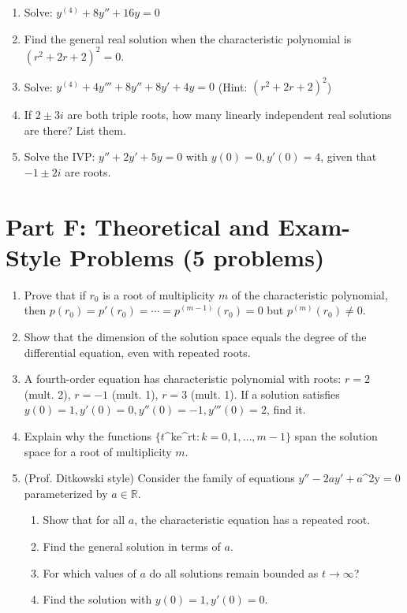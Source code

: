 \documentclass[12pt]{article}
\begin{document}
\begin{enumerate}[resume]
\item Solve: $y^{(4)} + 8y'' + 16y = 0$

\item Find the general real solution when the characteristic polynomial is $(r^{2} + 2r + 2)^{2} = 0$.

\item Solve: $y^{(4)} + 4y''' + 8y'' + 8y' + 4y = 0$ (Hint: $(r^{2} + 2r + 2)^{2}$)

\item If $2 \pm 3i$ are both triple roots, how many linearly independent real solutions are there? List them.

\item Solve the IVP: $y'' + 2y' + 5y = 0$ with $y(0) = 0, y'(0) = 4$, given that $-1 \pm 2i$ are roots.
\end{enumerate}

\section*{Part F: Theoretical and Exam-Style Problems (5 problems)}

\begin{enumerate}[resume]
\item Prove that if $r_{0}$ is a root of multiplicity $m$ of the characteristic polynomial, then $p(r_{0}) = p'(r_{0}) = \cdots = p^{(m-1)}(r_{0}) = 0$ but $p^{(m)}(r_{0}) \neq 0$.

\item Show that the dimension of the solution space equals the degree of the differential equation, even with repeated roots.

\item A fourth-order equation has characteristic polynomial with roots: $r = 2$ (mult. 2), $r = -1$ (mult. 1), $r = 3$ (mult. 1). If a solution satisfies $y(0) = 1, y'(0) = 0, y''(0) = -1, y'''(0) = 2$, find it.

\item Explain why the functions $\{t$^{k}$ $e^{rt}$ : k = 0, 1, \ldots, m-1\}$ span the solution space for a root of multiplicity $m$.

\item (Prof. Ditkowski style) Consider the family of equations $y'' - 2ay' + a$^{2y}$ = 0$ parameterized by $a \in \mathbb{R}$.
\begin{enumerate}[label=(\alph*)]
\item Show that for all $a$, the characteristic equation has a repeated root.
\item Find the general solution in terms of $a$.
\item For which values of $a$ do all solutions remain bounded as $t \to \infty$?
\item Find the solution with $y(0) = 1, y'(0) = 0$.
\end{enumerate}
\end{enumerate}
\end{document}
